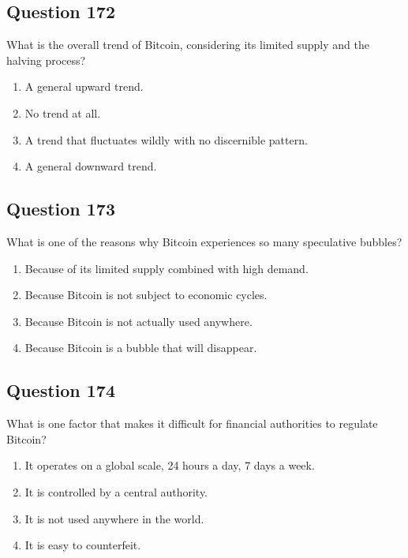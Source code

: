 \documentclass[12pt,a4paper]{article}
\begin{document}
\subsection*{Question 172}
What is the overall trend of Bitcoin, considering its limited supply and the halving process?

\begin{enumerate}[label=\Alph*., leftmargin=*]
\item A general upward trend.
\item No trend at all.
\item A trend that fluctuates wildly with no discernible pattern.
\item A general downward trend.
\end{enumerate}

\bigskip


\subsection*{Question 173}
What is one of the reasons why Bitcoin experiences so many speculative bubbles?

\begin{enumerate}[label=\Alph*., leftmargin=*]
\item Because of its limited supply combined with high demand.
\item Because Bitcoin is not subject to economic cycles.
\item Because Bitcoin is not actually used anywhere.
\item Because Bitcoin is a bubble that will disappear.
\end{enumerate}

\bigskip


\subsection*{Question 174}
What is one factor that makes it difficult for financial authorities to regulate Bitcoin?

\begin{enumerate}[label=\Alph*., leftmargin=*]
\item It operates on a global scale, 24 hours a day, 7 days a week.
\item It is controlled by a central authority.
\item It is not used anywhere in the world.
\item It is easy to counterfeit.
\end{enumerate}
\end{document}
